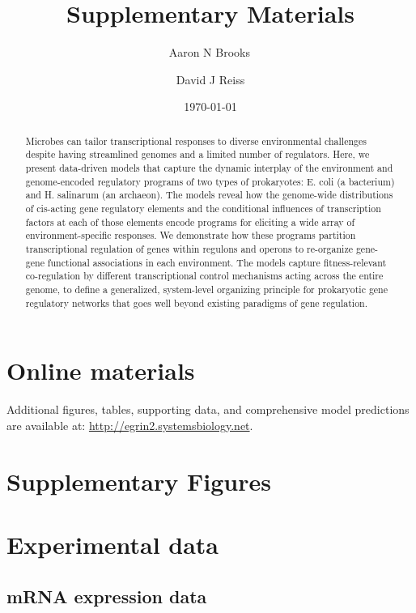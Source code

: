 \documentclass[11pt]{article}
\title{Supplementary Materials}
\author{
        Aaron N Brooks\, \\
            \and
        David J Reiss
}
\date{\today}
\begin{document}
\maketitle

\tableofcontents

\newpage

\begin{abstract}
Microbes can tailor transcriptional responses to diverse environmental
challenges despite having streamlined genomes and a limited number of
regulators. Here, we present data-driven models that capture the
dynamic interplay of the environment and genome-encoded regulatory
programs of two types of prokaryotes: E. coli (a bacterium) and
H. salinarum (an archaeon). The models reveal how the genome-wide
distributions of cis-acting gene regulatory elements and the
conditional influences of transcription factors at each of those
elements encode programs for eliciting a wide array of
environment-specific responses. We demonstrate how these programs
partition transcriptional regulation of genes within regulons and
operons to re-organize gene-gene functional associations in each
environment. The models capture fitness-relevant co-regulation by
different transcriptional control mechanisms acting across the entire
genome, to define a generalized, system-level organizing principle for
prokaryotic gene regulatory networks that goes well beyond existing
paradigms of gene regulation.
\end{abstract}

\section{Online materials}
Additional figures, tables, supporting data, and comprehensive model
predictions are available at: \newline
\url{http://egrin2.systemsbiology.net}.

\section{Supplementary Figures}\label{suppfigs}


\section{Experimental data}\label{data}

\subsection{mRNA expression data}
\end{document}

